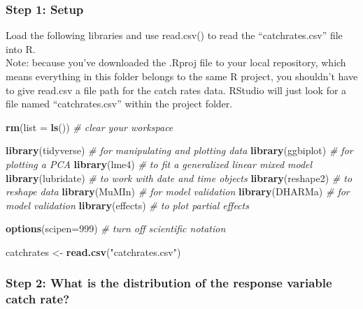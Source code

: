 \documentclass[]{article}
\newenvironment{Shaded}{\begin{snugshade}}{\end{snugshade}}
\newcommand{\CommentTok}[1]{\textcolor[rgb]{0.56,0.35,0.01}{\textit{#1}}}
\newcommand{\DataTypeTok}[1]{\textcolor[rgb]{0.13,0.29,0.53}{#1}}
\newcommand{\DecValTok}[1]{\textcolor[rgb]{0.00,0.00,0.81}{#1}}
\newcommand{\KeywordTok}[1]{\textcolor[rgb]{0.13,0.29,0.53}{\textbf{#1}}}
\newcommand{\NormalTok}[1]{#1}
\newcommand{\StringTok}[1]{\textcolor[rgb]{0.31,0.60,0.02}{#1}}
\begin{document}
\hypertarget{step-1-setup}{%
\subsubsection{Step 1: Setup}\label{step-1-setup}}

Load the following libraries and use read.csv() to read the
``catchrates.csv'' file into R.\\
Note: because you've downloaded the .Rproj file to your local
repository, which means everything in this folder belongs to the same R
project, you shouldn't have to give read.csv a file path for the catch
rates data. RStudio will just look for a file named ``catchrates.csv''
within the project folder.

\begin{Shaded}
\begin{Highlighting}[]
\KeywordTok{rm}\NormalTok{(}\DataTypeTok{list =} \KeywordTok{ls}\NormalTok{())       }\CommentTok{# clear your workspace}

\KeywordTok{library}\NormalTok{(tidyverse)    }\CommentTok{# for manipulating and plotting data}
\KeywordTok{library}\NormalTok{(ggbiplot)     }\CommentTok{# for plotting a PCA}
\KeywordTok{library}\NormalTok{(lme4)         }\CommentTok{# to fit a generalized linear mixed model}
\KeywordTok{library}\NormalTok{(lubridate)    }\CommentTok{# to work with date and time objects}
\KeywordTok{library}\NormalTok{(reshape2)     }\CommentTok{# to reshape data}
\KeywordTok{library}\NormalTok{(MuMIn)        }\CommentTok{# for model validation}
\KeywordTok{library}\NormalTok{(DHARMa)       }\CommentTok{# for model validation}
\KeywordTok{library}\NormalTok{(effects)      }\CommentTok{# to plot partial effects}

\KeywordTok{options}\NormalTok{(}\DataTypeTok{scipen=}\DecValTok{999}\NormalTok{)   }\CommentTok{# turn off scientific notation}

\NormalTok{catchrates <-}\StringTok{ }\KeywordTok{read.csv}\NormalTok{(}\StringTok{"catchrates.csv"}\NormalTok{)}
\end{Highlighting}
\end{Shaded}

\hypertarget{step-2-what-is-the-distribution-of-the-response-variable-catch-rate}{%
\subsubsection{Step 2: What is the distribution of the response variable
catch
rate?}\label{step-2-what-is-the-distribution-of-the-response-variable-catch-rate}}
\end{document}
